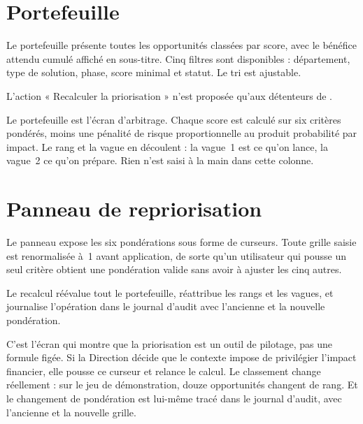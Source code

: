 \section{Portefeuille}

Le portefeuille présente toutes les opportunités classées par score, avec le bénéfice
attendu cumulé affiché en sous-titre. Cinq filtres sont disponibles : département, type
de solution, phase, score minimal et statut. Le tri est ajustable.

L'action « Recalculer la priorisation » n'est proposée qu'aux détenteurs de
.


\begin{oral}
Le portefeuille est l'écran d'arbitrage. Chaque score est calculé sur six critères
pondérés, moins une pénalité de risque proportionnelle au produit probabilité par
impact. Le rang et la vague en découlent : la vague~1 est ce qu'on lance, la vague~2 ce
qu'on prépare. Rien n'est saisi à la main dans cette colonne.
\end{oral}

\section{Panneau de repriorisation}

Le panneau expose les six pondérations sous forme de curseurs. Toute grille saisie est
renormalisée à~1 avant application, de sorte qu'un utilisateur qui pousse un seul critère
obtient une pondération valide sans avoir à ajuster les cinq autres.

Le recalcul réévalue tout le portefeuille, réattribue les rangs et les vagues, et
journalise l'opération dans le journal d'audit avec l'ancienne et la nouvelle
pondération.


\begin{oral}
C'est l'écran qui montre que la priorisation est un outil de pilotage, pas une formule
figée. Si la Direction décide que le contexte impose de privilégier l'impact financier,
elle pousse ce curseur et relance le calcul. Le classement change réellement : sur le
jeu de démonstration, douze opportunités changent de rang. Et le changement de
pondération est lui-même tracé dans le journal d'audit, avec l'ancienne et la nouvelle
grille.
\end{oral}

